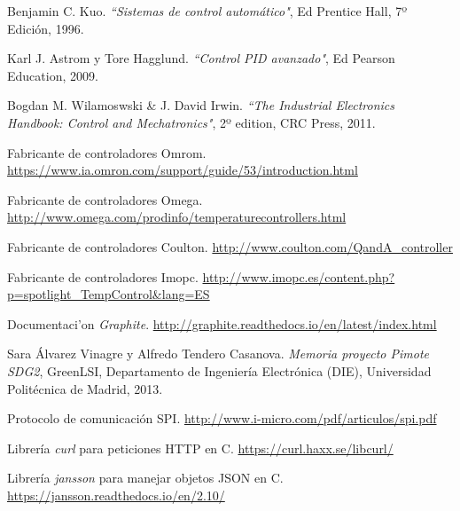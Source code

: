 \begin{thebibliography}{x}
	 Benjamin C. Kuo. \textit{``Sistemas de control automático"}, Ed Prentice Hall, 7º Edición, 1996.
	       
	 Karl J. Astrom y Tore Hagglund. \textit{``Control PID avanzado"}, Ed Pearson Education, 2009. 

	 Bogdan M. Wilamoswski \& J. David Irwin. \textit{``The Industrial Electronics Handbook: Control and Mechatronics"}, 2º edition, CRC Press, 2011.
	
	 Fabricante de controladores Omrom. \url{https://www.ia.omron.com/support/guide/53/introduction.html}

	 Fabricante de controladores Omega. \url{http://www.omega.com/prodinfo/temperaturecontrollers.html}

	 Fabricante de controladores Coulton. \url{http://www.coulton.com/QandA_controller}

	 Fabricante de controladores Imopc. \url{http://www.imopc.es/content.php?p=spotlight_TempControl&lang=ES}

	 Documentaci'on \textit{Graphite}. \url{http://graphite.readthedocs.io/en/latest/index.html}
	
	 Sara Álvarez Vinagre y Alfredo Tendero Casanova.
	\textit{Memoria proyecto Pimote SDG2}, GreenLSI, Departamento de Ingeniería Electrónica (DIE), Universidad Politécnica de Madrid, 2013.

            Protocolo de comunicación SPI. \url{http://www.i-micro.com/pdf/articulos/spi.pdf}

	 Librería \textit{curl} para peticiones HTTP en C. \url{https://curl.haxx.se/libcurl/}

	 Librería \textit{jansson} para manejar objetos JSON en C. \url{https://jansson.readthedocs.io/en/2.10/}

\end{thebibliography}
